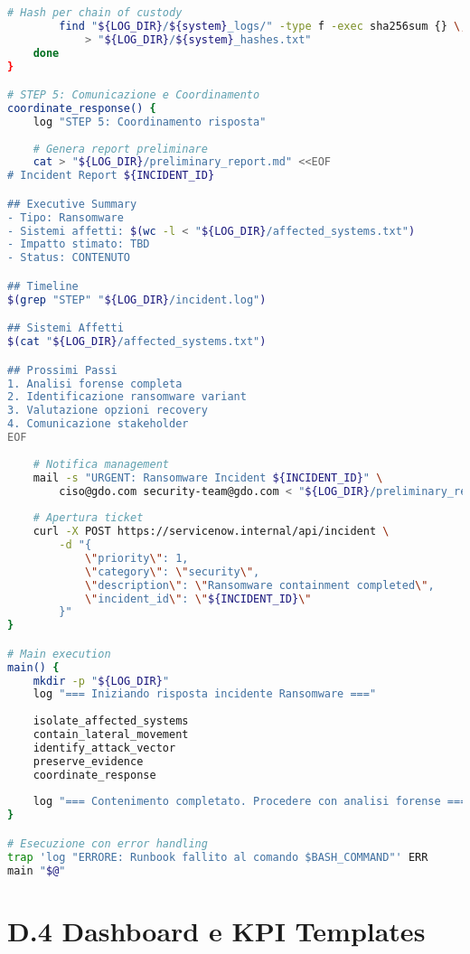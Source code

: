 \begin{lstlisting}[language=bash, caption=Runbook automatizzato per contenimento ransomware]
        # Hash per chain of custody
        find "${LOG_DIR}/${system}_logs/" -type f -exec sha256sum {} \; \
            > "${LOG_DIR}/${system}_hashes.txt"
    done
}

# STEP 5: Comunicazione e Coordinamento
coordinate_response() {
    log "STEP 5: Coordinamento risposta"
    
    # Genera report preliminare
    cat > "${LOG_DIR}/preliminary_report.md" <<EOF
# Incident Report ${INCIDENT_ID}

## Executive Summary
- Tipo: Ransomware
- Sistemi affetti: $(wc -l < "${LOG_DIR}/affected_systems.txt")
- Impatto stimato: TBD
- Status: CONTENUTO

## Timeline
$(grep "STEP" "${LOG_DIR}/incident.log")

## Sistemi Affetti
$(cat "${LOG_DIR}/affected_systems.txt")

## Prossimi Passi
1. Analisi forense completa
2. Identificazione ransomware variant
3. Valutazione opzioni recovery
4. Comunicazione stakeholder
EOF
    
    # Notifica management
    mail -s "URGENT: Ransomware Incident ${INCIDENT_ID}" \
        ciso@gdo.com security-team@gdo.com < "${LOG_DIR}/preliminary_report.md"
    
    # Apertura ticket
    curl -X POST https://servicenow.internal/api/incident \
        -d "{
            \"priority\": 1,
            \"category\": \"security\",
            \"description\": \"Ransomware containment completed\",
            \"incident_id\": \"${INCIDENT_ID}\"
        }"
}

# Main execution
main() {
    mkdir -p "${LOG_DIR}"
    log "=== Iniziando risposta incidente Ransomware ==="
    
    isolate_affected_systems
    contain_lateral_movement
    identify_attack_vector
    preserve_evidence
    coordinate_response
    
    log "=== Contenimento completato. Procedere con analisi forense ==="
}

# Esecuzione con error handling
trap 'log "ERRORE: Runbook fallito al comando $BASH_COMMAND"' ERR
main "$@"
\end{lstlisting}

\section{\texorpdfstring{\textbf{D.4 Dashboard e KPI Templates}}{D.4 - Dashboard e KPI Templates}}

